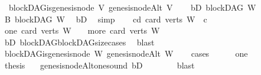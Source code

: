 \begin{isabellebody}
\ \ blockDAG{\isachardot}{\kern0pt}is{\isacharunderscore}{\kern0pt}genesis{\isacharunderscore}{\kern0pt}node\ V\ {\isacharparenleft}{\kern0pt}genesis{\isacharunderscore}{\kern0pt}nodeAlt\ V{\isacharparenright}{\kern0pt}{\isacharparenright}{\kern0pt}{\isachardoublequoteclose}\isanewline
\ \ \isamarkupfalse%
\ bD{\isacharcolon}{\kern0pt}\ {\isachardoublequoteopen}blockDAG\ W{\isachardoublequoteclose}\isanewline
\ \ \isamarkupfalse%
\ B{\isacharcolon}{\kern0pt}\ blockDAG\ {\isachardoublequoteopen}W{\isachardoublequoteclose}\ \isamarkupfalse%
\ bD\ \isamarkupfalse%
\ simp\isanewline
\ \ \isamarkupfalse%
\ cd{\isacharcolon}{\kern0pt}\ {\isachardoublequoteopen}card\ {\isacharparenleft}{\kern0pt}verts\ W{\isacharparenright}{\kern0pt}\ {\isacharequal}{\kern0pt}\ c{\isachardoublequoteclose}\ \isanewline
\ \ \isamarkupfalse%
\ {\isacharparenleft}{\kern0pt}one{\isacharparenright}{\kern0pt}\ {\isachardoublequoteopen}card\ {\isacharparenleft}{\kern0pt}verts\ W{\isacharparenright}{\kern0pt}\ {\isacharequal}{\kern0pt}\ {}{\isachardoublequoteclose}\ {\isacharbar}{\kern0pt}\ {\isacharparenleft}{\kern0pt}more{\isacharparenright}{\kern0pt}\ {\isachardoublequoteopen}card\ {\isacharparenleft}{\kern0pt}verts\ W{\isacharparenright}{\kern0pt}\ {\isachargreater}{\kern0pt}\ {}{\isachardoublequoteclose}\isanewline
\ \ \ \ \isamarkupfalse%
\ bD\ blockDAG{\isachardot}{\kern0pt}blockDAG{\isacharunderscore}{\kern0pt}size{\isacharunderscore}{\kern0pt}cases\ \isamarkupfalse%
\ blast\isanewline
\ \ \isamarkupfalse%
\ \isamarkupfalse%
\ {\isachardoublequoteopen}blockDAG{\isachardot}{\kern0pt}is{\isacharunderscore}{\kern0pt}genesis{\isacharunderscore}{\kern0pt}node\ W\ {\isacharparenleft}{\kern0pt}genesis{\isacharunderscore}{\kern0pt}nodeAlt\ W{\isacharparenright}{\kern0pt}{\isachardoublequoteclose}\ \isanewline
\ \ \isamarkupfalse%
{\isacharparenleft}{\kern0pt}cases{\isacharparenright}{\kern0pt}\isanewline
\ \ \ \ \isamarkupfalse%
\ one\isanewline
\ \ \ \ \isamarkupfalse%
\ \isamarkupfalse%
\ {\isacharquery}{\kern0pt}thesis\ \ \isamarkupfalse%
\ genesis{\isacharunderscore}{\kern0pt}nodeAlt{\isacharunderscore}{\kern0pt}one{\isacharunderscore}{\kern0pt}sound\ bD\isanewline
\ \ \ \ \ \ \isamarkupfalse%
\ blast\isanewline
\ \ \isamarkupfalse%
\isanewline
\ \ \ \ \isamarkupfalse%

\end{isabellebody}
